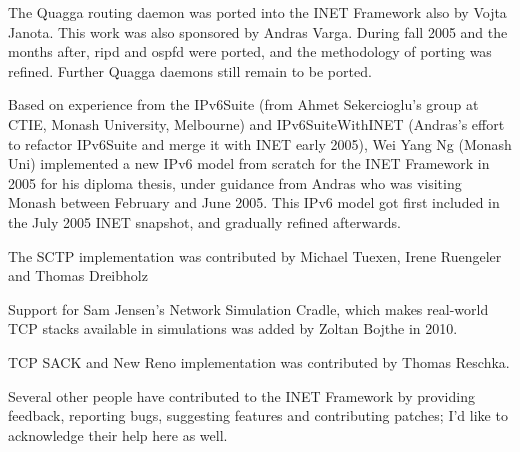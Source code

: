 The Quagga routing daemon was ported into the INET Framework also by Vojta
Janota. This work was also sponsored by Andras Varga. During fall 2005 and 
the months after, ripd and ospfd were ported, and the methodology of porting 
was refined. Further Quagga daemons still remain to be ported.

Based on experience from the IPv6Suite (from Ahmet Sekercioglu's group at
CTIE, Monash University, Melbourne) and IPv6SuiteWithINET (Andras's effort
to refactor IPv6Suite and merge it with INET early 2005), Wei Yang Ng
(Monash Uni) implemented a new IPv6 model from scratch for the
INET Framework in 2005 for his diploma thesis, under guidance from Andras
who was visiting Monash between February and June 2005. This IPv6 model
got first included in the July 2005 INET snapshot, and gradually refined
afterwards.

The SCTP implementation was contributed by Michael Tuexen, Irene Ruengeler
and Thomas Dreibholz

Support for Sam Jensen's Network Simulation Cradle,
which makes real-world TCP stacks available in simulations was added
by Zoltan Bojthe in 2010.

TCP SACK and New Reno implementation was contributed by Thomas Reschka.

Several other people have contributed to the INET Framework by providing
feedback, reporting bugs, suggesting features and contributing patches;
I'd like to acknowledge their help here as well.




